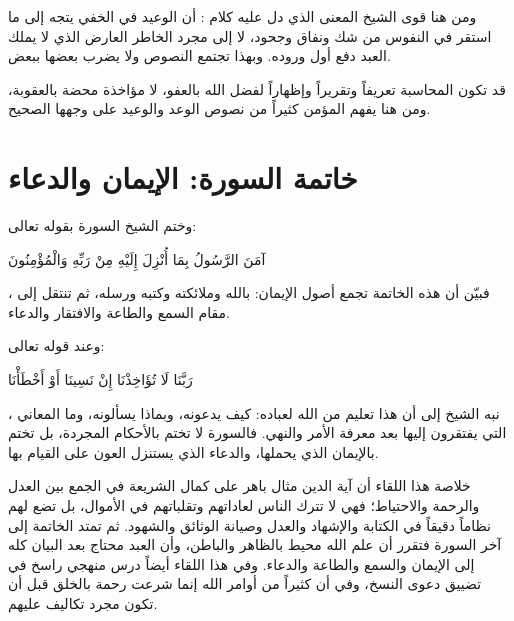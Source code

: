 ومن هنا قوى الشيخ المعنى الذي دل عليه كلام : أن الوعيد في الخفي يتجه إلى ما استقر في النفوس من شك ونفاق وجحود، لا إلى مجرد الخاطر العارض الذي لا يملك العبد دفع أول وروده. وبهذا تجتمع النصوص ولا يضرب بعضها ببعض.

\begin{fawaid}
قد تكون المحاسبة تعريفاً وتقريراً وإظهاراً لفضل الله بالعفو، لا مؤاخذة محضة بالعقوبة، ومن هنا يفهم المؤمن كثيراً من نصوص الوعد والوعيد على وجهها الصحيح.
\end{fawaid}

\section{خاتمة السورة: الإيمان والدعاء}
وختم الشيخ السورة بقوله تعالى: \begin{ayah}آمَنَ الرَّسُولُ بِمَا أُنْزِلَ إِلَيْهِ مِنْ رَبِّهِ وَالْمُؤْمِنُونَ\end{ayah}، فبيّن أن هذه الخاتمة تجمع أصول الإيمان: بالله وملائكته وكتبه ورسله، ثم تنتقل إلى مقام السمع والطاعة والافتقار والدعاء.

وعند قوله تعالى: \begin{ayah}رَبَّنَا لَا تُؤَاخِذْنَا إِنْ نَسِينَا أَوْ أَخْطَأْنَا\end{ayah}، نبه الشيخ إلى أن هذا تعليم من الله لعباده: كيف يدعونه، وبماذا يسألونه، وما المعاني التي يفتقرون إليها بعد معرفة الأمر والنهي. فالسورة لا تختم بالأحكام المجردة، بل تختم بالإيمان الذي يحملها، والدعاء الذي يستنزل العون على القيام بها.

\separator

خلاصة هذا اللقاء أن آية الدين مثال باهر على كمال الشريعة في الجمع بين العدل والرحمة والاحتياط؛ فهي لا تترك الناس لعاداتهم وتقلباتهم في الأموال، بل تضع لهم نظاماً دقيقاً في الكتابة والإشهاد والعدل وصيانة الوثائق والشهود. ثم تمتد الخاتمة إلى آخر السورة فتقرر أن علم الله محيط بالظاهر والباطن، وأن العبد محتاج بعد البيان كله إلى الإيمان والسمع والطاعة والدعاء. وفي هذا اللقاء أيضاً درس منهجي راسخ في تضييق دعوى النسخ، وفي أن كثيراً من أوامر الله إنما شرعت رحمة بالخلق قبل أن تكون مجرد تكاليف عليهم.
